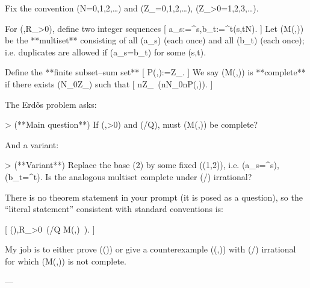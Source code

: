 Fix the convention (\mathbb N={0,1,2,\dots}) and (\mathbb Z_{}={0,1,2,\dots}), (\mathbb Z_{>0}={1,2,3,\dots}).

For (\alpha,\beta\in\mathbb R_{>0}), define two integer sequences
[
a_s:=\big{}^s\alpha\big\rfloor,\qquad b_t:=\big{}^t\beta\big\rfloor\qquad (s,t\in\mathbb N).
]
Let (M(\alpha,\beta)) be the **multiset** consisting of all (a_s) (each once) and all (b_t) (each once); i.e. duplicates are allowed if (a_s=b_t) for some (s,t).

Define the **finite subset–sum set**
[
P(\alpha,\beta):=\subseteq \mathbb Z_{}.
]
We say (M(\alpha,\beta)) is **complete** if there exists (N_0\in\mathbb Z_{}) such that
[
\forall n\in\mathbb Z_{}\ (n\ge N_0\implies n\in P(\alpha,\beta)).
]

The Erdős problem asks:

> (**Main question**) If (\alpha,\beta>0) and (\alpha/\beta\notin\mathbb Q), must (M(\alpha,\beta)) be complete?

And a variant:

> (**Variant**) Replace the base (2) by some fixed (\gamma\in(1,2)), i.e. (a_s=\lfloor \gamma^s\alpha\rfloor), (b_t=\lfloor \gamma^t\beta\rfloor). Is the analogous multiset complete under (\alpha/\beta) irrational?

There is no theorem statement in your prompt (it is posed as a question), so the “literal statement” consistent with standard conventions is:

[
(\star)\qquad \forall \alpha,\beta\in\mathbb R_{>0}\ \big(\alpha/\beta\notin\mathbb Q \implies M(\alpha,\beta)\ \big).
]

My job is to either prove ((\star)) or give a counterexample ((\alpha,\beta)) with (\alpha/\beta) irrational for which (M(\alpha,\beta)) is not complete.

---
